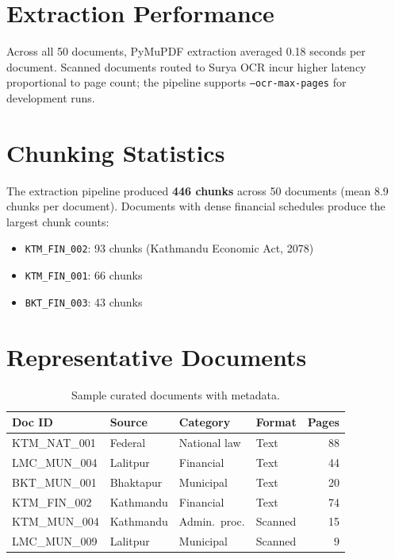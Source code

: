 \section{Extraction Performance}
Across all 50 documents, PyMuPDF extraction averaged 0.18 seconds per document. Scanned documents routed to Surya OCR incur higher latency proportional to page count; the pipeline supports \texttt{--ocr-max-pages} for development runs.

\section{Chunking Statistics}
The extraction pipeline produced \textbf{446 chunks} across 50 documents (mean 8.9 chunks per document). Documents with dense financial schedules produce the largest chunk counts:
\begin{itemize}[leftmargin=*]
  \item \texttt{KTM\_FIN\_002}: 93 chunks (Kathmandu Economic Act, 2078)
  \item \texttt{KTM\_FIN\_001}: 66 chunks
  \item \texttt{BKT\_FIN\_003}: 43 chunks
\end{itemize}

\section{Representative Documents}
\begin{table}[H]
  \centering
  \caption{Sample curated documents with metadata.}
  \label{tab:sample-docs}
  \small
  \begin{tabular}{@{}llllr@{}}
    \toprule
    \textbf{Doc ID} & \textbf{Source} & \textbf{Category} & \textbf{Format} & \textbf{Pages} \\
    \midrule
    KTM\_NAT\_001 & Federal & National law & Text & 88 \\
    LMC\_MUN\_004 & Lalitpur & Financial & Text & 44 \\
    BKT\_MUN\_001 & Bhaktapur & Municipal & Text & 20 \\
    KTM\_FIN\_002 & Kathmandu & Financial & Text & 74 \\
    KTM\_MUN\_004 & Kathmandu & Admin.\ proc. & Scanned & 15 \\
    LMC\_MUN\_009 & Lalitpur & Municipal & Scanned & 9 \\
    \bottomrule
  \end{tabular}
\end{table}

